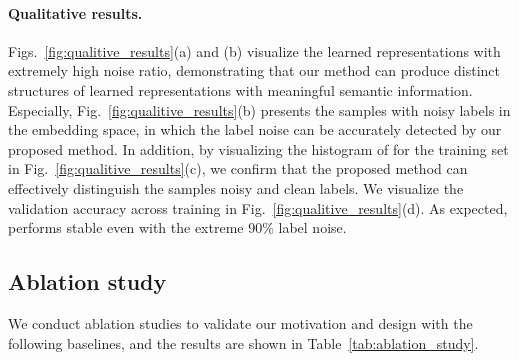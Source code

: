 \paragraph{Qualitative results.} Figs.~\ref{fig:qualitive_results}(a) and (b) visualize the learned representations with extremely high noise ratio, demonstrating that our method can produce distinct structures of learned representations with meaningful semantic information. Especially, Fig.~\ref{fig:qualitive_results}(b) presents the samples with noisy labels in the embedding space, in which the label noise can be accurately detected by our proposed method. In addition, by visualizing the histogram of  for the training set in Fig.~\ref{fig:qualitive_results}(c), we confirm that the proposed method can effectively distinguish the samples noisy and clean labels.
We visualize the validation accuracy across training in Fig.~\ref{fig:qualitive_results}(d). As expected, \methodname performs stable even with the extreme 90\% label noise.

\subsection{Ablation study}

We conduct ablation studies to validate our motivation and design with the following baselines, and the results are shown in Table~\ref{tab:ablation_study}.

